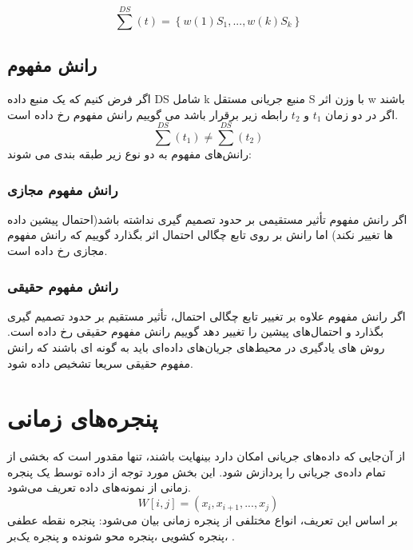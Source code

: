 \begin{equation}
\sum^{DS}(t) = \left\{ w(1)S_1, ..., w(k)S_k \right\}
\end{equation}

\subsection{رانش مفهوم}

 اگر فرض کنیم که یک منبع داده DS شامل k منبع جریانی مستقل S با وزن اثر w باشند اگر در دو زمان $t_1$ و $t_2$ رابطه زیر برقرار باشد می گوییم رانش مفهوم رخ داده است.
\begin{equation}
\sum^{DS}(t_1) \neq \sum^{DS}(t_2)
\end{equation}
رانش‌های مفهوم به دو نوع زیر طبقه بندی می شوند:

\subsubsection{رانش مفهوم مجازی}
اگر رانش مفهوم تأثیر مستقیمی بر حدود تصمیم گیری نداشته باشد(احتمال پیشین داده ها تغییر نکند) اما رانش بر روی تابع چگالی احتمال اثر بگذارد گوییم که رانش مفهوم مجازی رخ داده است.

\subsubsection{رانش مفهوم حقیقی}
اگر رانش مفهوم علاوه بر تغییر تابع چگالی احتمال، تأثیر مستقیم بر حدود تصمیم گیری بگذارد و احتمال‌های پیشین را تغییر دهد گوییم رانش مفهوم حقیقی رخ داده است. روش های یادگیری در محیط‌های جریان‌های داده‌ای باید به گونه ای باشند که رانش مفهوم حقیقی سریعا تشخیص داده شود.

\section{پنجره‌های زمانی}
از آن‌جایی که داده‌های جریانی امکان دارد بینهایت باشند، تنها مقدور است که بخشی از تمام داده‌ی جریانی را پردازش شود. این بخش مورد توجه از داده توسط یک پنجره زمانی از نمونه‌های داده تعریف می‌شود.
\begin{equation}
W[i, j] = (x_i, x_{i+1}, ..., x_j)
\end{equation}
بر اساس این تعریف، انواع مختلفی از پنجره زمانی بیان‌ می‌شود: پنجره نقطه عطفی
،پنجره کشویی
،پنجره محو شونده
و پنجره یک‌بر
.

